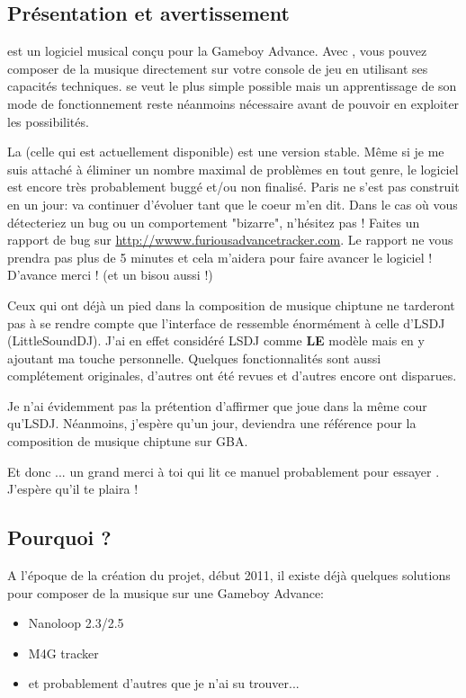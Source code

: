 \subsection{Présentation et avertissement}
\FAT est un logiciel musical conçu pour la Gameboy Advance.
Avec \FAT, vous pouvez composer de la musique directement sur votre console de jeu en utilisant ses capacités techniques.
\FAT se veut le plus simple possible mais un apprentissage de son mode de fonctionnement reste néanmoins nécessaire avant de pouvoir en exploiter les possibilités.\medskip

La \fatversion (celle qui est actuellement disponible) est une version stable.
Même si je me suis attaché à éliminer un nombre maximal de problèmes en tout genre, le logiciel est encore très probablement buggé et/ou non finalisé.
Paris ne s'est pas construit en un jour: \FAT va continuer d'évoluer tant que le coeur m'en dit.
Dans le cas où vous détecteriez un bug ou un comportement "bizarre", n'hésitez pas !
Faites un rapport de bug sur \url{http://wwww.furiousadvancetracker.com}.
Le rapport ne vous prendra pas plus de 5 minutes et cela m'aidera pour faire avancer le logiciel !
D'avance merci ! (et un bisou aussi !)
\medskip

Ceux qui ont déjà un pied dans la composition de musique chiptune ne tarderont pas à se rendre compte que l'interface de \FAT ressemble énormément à celle d'LSDJ (LittleSoundDJ).
J'ai en effet considéré LSDJ comme {\bf LE} modèle mais en y ajoutant ma touche personnelle.
Quelques fonctionnalités sont aussi complétement originales, d'autres ont été revues et d'autres encore ont disparues.
\medskip

Je n'ai évidemment pas la prétention d'affirmer que \FAT joue dans la même cour qu'LSDJ.
Néanmoins, j'espère qu'un jour, \FAT deviendra une référence pour la composition de musique chiptune sur GBA.\medskip

Et donc ... un grand merci à toi qui lit ce manuel probablement pour essayer \FAT. J'espère qu'il te plaira !

\subsection{Pourquoi \FAT ?}
A l'époque de la création du projet, début 2011, il existe déjà quelques solutions pour composer de la musique sur une Gameboy Advance:
\medskip

\begin{itemize}
  \item{Nanoloop 2.3/2.5}
  \item{M4G tracker}
  \item{et probablement d'autres que je n'ai su trouver...}
\end{itemize}\medskip

